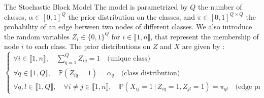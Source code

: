 \documentclass[final]{beamer}
\newlength{\colwidth}
\begin{document}
\begin{frame}[t]
\begin{columns}[t]
\begin{column}{\colwidth}
\begin{block}{The Stochastic Block Model}
        The model is parametrized by $Q$ the number of classes, $\alpha\in [0,1]^Q$ the prior distribution on the classes, and $\pi\in [0,1]^{Q\times Q}$ the probability of an edge between two nodes of different classes. We also introduce the random variables $Z_i\in \{0,1\}^Q$ for $i\in \llbracket 1,n \rrbracket$, that represent the membership of node $i$ to each class. The prior distributions on $Z$ and $X$ are given by :
        \begin{equation}
          \begin{cases}
            \forall i\in \llbracket 1,n \rrbracket, \quad \sum_{q=1}^Q Z_{iq} = 1 \quad\text{(unique class)}            \\
            \forall q\in \llbracket 1,Q \rrbracket,\quad \mathbb{P}(Z_{iq}=1)=\alpha_q \quad\text{(class distribution)} \\
            \forall q,l\in \llbracket 1,Q \rrbracket, \quad \forall i\neq j\in \llbracket 1,n \rrbracket, \quad \mathbb{P}(X_{ij}=1\,|\,Z_{iq}=1,Z_{jl}=1)=\pi_{ql} \quad\text{(edge probability)}
          \end{cases}
        \end{equation}
      \end{block}


\end{column}
\end{columns}
\end{frame}
\end{document}
